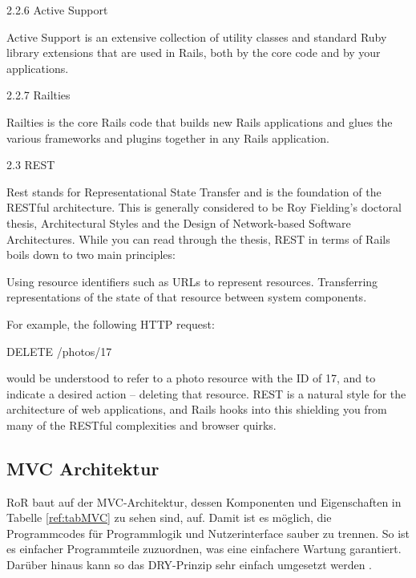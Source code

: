 \begin{k}
2.2.6 Active Support

Active Support is an extensive collection of utility classes and standard Ruby
library extensions that are used in Rails, both by the core code and by your
applications.

2.2.7 Railties

Railties is the core Rails code that builds new Rails applications and glues the
various frameworks and plugins together in any Rails application.

2.3 REST

Rest stands for Representational State Transfer and is the foundation of the
RESTful architecture. This is generally considered to be Roy Fielding’s doctoral
thesis, Architectural Styles and the Design of Network-based Software
Architectures. While you can read through the thesis, REST in terms of Rails
boils down to two main principles:

    Using resource identifiers such as URLs to represent resources.
    Transferring representations of the state of that resource between system components.

For example, the following HTTP request:

DELETE /photos/17

would be understood to refer to a photo resource with the ID of 17, and to
indicate a desired action – deleting that resource. REST is a natural style for
the architecture of web applications, and Rails hooks into this shielding you
from many of the RESTful complexities and browser quirks.
\end{k}

\subsection{MVC Architektur}\label{ref:basMVC}
\ac{RoR} baut auf der \ac{MVC}-Architektur, dessen Komponenten und Eigenschaften
in Tabelle \ref{ref:tabMVC} zu sehen sind, auf. Damit ist es möglich, die
Programmcodes für Programmlogik und Nutzerinterface sauber zu trennen. So ist es
einfacher Programmteile zuzuordnen, was eine einfachere Wartung garantiert.
Darüber hinaus kann so das \ac{DRY}-Prinzip sehr einfach umgesetzt werden
\cite{railsGuides:2013}.

